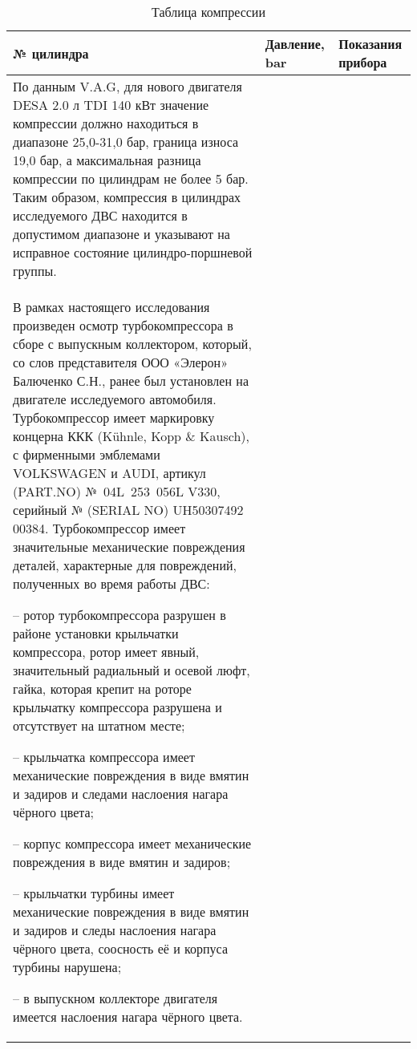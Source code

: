  
 \begin{longtable}{G{25mm}|M{44mm}|G{70mm}}
 	\caption[]{\footnotesize {Таблица компрессии}} 
 	\label{tab:6}\\ 
 	\hline 
 	\hline  \toprule 
 	\bf  {\footnotesize  № цилиндра}  &\bf {\small Давление, bar} & \bf {\small Показания прибора} \\   \hline\hline  \toprule \endhead 
 	
 	
По данным V.A.G, для нового двигателя  DESA 2.0 л TDI 140 кВт  значение компрессии должно находиться в диапазоне 25,0-31,0 бар,  граница износа 19,0 бар, а максимальная разница компрессии по цилиндрам не более 5 бар.  Таким образом, компрессия в цилиндрах исследуемого ДВС находится в допустимом диапазоне и указывают на исправное состояние цилиндро-поршневой группы.\\

В рамках настоящего исследования произведен осмотр турбокомпрессора в сборе с выпускным коллектором, который, со слов представителя ООО «Элерон» Балюченко С.Н., ранее был установлен на двигателе исследуемого автомобиля. Турбокомпрессор имеет маркировку  концерна ККК (Kühnle, Kopp \& Kausch), с фирменными эмблемами VOLKSWAGEN и AUDI, артикул (PART.NO) № 04L 253 056L V330, серийный № (SERIAL NO) UH50307492 00384.  Турбокомпрессор имеет значительные механические повреждения деталей, характерные для повреждений, полученных во время работы ДВС:

-- ротор турбокомпрессора разрушен в районе установки крыльчатки компрессора, ротор имеет явный, значительный радиальный и осевой люфт, гайка, которая крепит на роторе крыльчатку компрессора разрушена и отсутствует на штатном месте;

-- крыльчатка компрессора имеет механические повреждения в виде вмятин и задиров и следами наслоения нагара чёрного цвета;

-- корпус компрессора имеет механические повреждения в виде вмятин и задиров;

-- крыльчатки турбины имеет механические повреждения в виде вмятин и задиров и следы наслоения нагара чёрного цвета, соосность её и корпуса турбины нарушена;

-- в выпускном коллекторе двигателя имеется наслоения нагара чёрного цвета.





\end{longtable}
